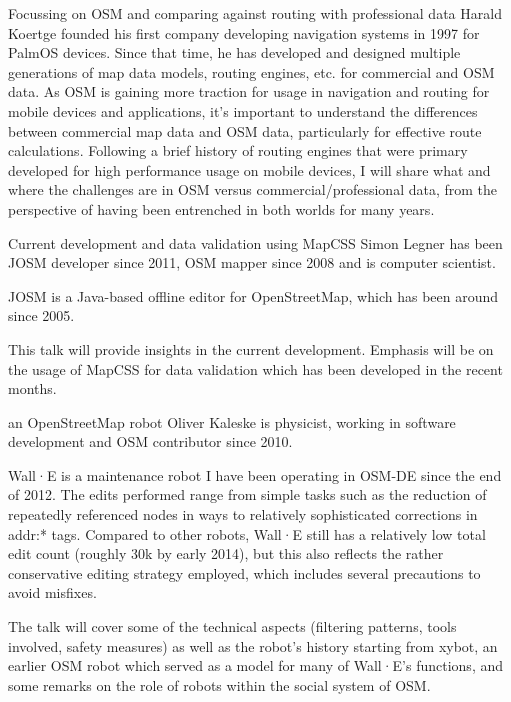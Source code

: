 %
{Focussing on OSM and comparing against routing with professional data}%
{Harald Koertge founded his first company developing navigation systems in 1997 for PalmOS devices. Since that time, he has developed and designed multiple generations of map data models, routing engines, etc. for commercial and OSM data.}%
{As OSM is gaining more traction for usage in navigation and routing for mobile devices and applications, it’s important to understand the differences between commercial map data and OSM data, particularly for effective route calculations. Following a brief history of routing engines that were primary developed for high performance usage on mobile devices, I will share what and where the challenges are in OSM versus commercial/professional data, from the perspective of having been entrenched in both worlds for many years.}

%
{Current development and data validation using MapCSS}%
{Simon Legner has been JOSM developer since 2011, OSM mapper since 2008 and is computer scientist.}%
{JOSM is a Java-based offline editor for OpenStreetMap, which has been around since 2005.

This talk will provide insights in the current development. Emphasis will be on the usage of MapCSS for data validation which has been developed in the recent months.}

%
{an OpenStreetMap robot}%
{Oliver Kaleske is physicist, working in software development and OSM contributor since 2010.}%
{Wall·E is a maintenance robot I have been operating in OSM-DE since the end of 2012. The edits performed range from simple tasks such as the reduction of repeatedly referenced nodes in
ways to relatively sophisticated corrections in addr:* tags. Compared to other robots, Wall·E still has a relatively low total edit count (roughly 30k by early 2014), but this also
reflects the rather conservative editing strategy employed, which includes several precautions to avoid misfixes.

The talk will cover some of the technical aspects (filtering patterns, tools involved, safety measures) as well as the robot's history starting from xybot, an earlier OSM robot which served as
a model for many of Wall·E's functions, and some remarks on the role of robots within the social system of OSM.}

